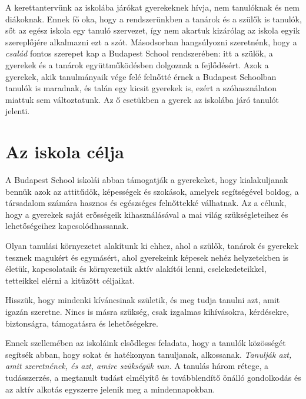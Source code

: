 A kerettantervünk az iskolába járókat gyerekeknek hívja, nem tanulóknak és nem diákoknak. Ennek fő oka, hogy a rendszerünkben a tanárok és a szülők is tanulók, sőt az egész iskola egy tanuló szervezet, így nem akartuk  kizárólag az iskola egyik szereplőjére alkalmazni ezt a szót. Másodsorban hangsúlyozni szeretnénk, hogy a \emph{család} fontos szerepet kap a Budapest School rendszerében: itt a szülők, a gyerekek és a tanárok együttműködésben dolgoznak a fejlődésért. Azok a gyerekek, akik tanulmányaik vége felé felnőtté érnek a Budapest Schoolban tanulók is maradnak, és talán egy kicsit gyerekek is, ezért a szóhasználaton miattuk sem változtatunk. Az ő esetükben a gyerek az iskolába járó tanulót jelenti.  

\section{Az iskola célja}

A Budapest School iskolái abban támogatják a gyerekeket, hogy kialakuljanak bennük azok az attitűdök, képességek és szokások, amelyek segítségével boldog, a társadalom számára hasznos és egészséges felnőttekké válhatnak. Az a célunk, hogy a gyerekek saját erősségeik kihasználásával a mai világ szükségleteihez és lehetőségeihez kapcsolódhassanak.  

Olyan tanulási környezetet alakítunk ki ehhez, ahol a szülők, tanárok és gyerekek tesznek magukért és egymásért, ahol gyerekeink képesek nehéz helyzetekben is életük, kapcsolataik és környezetük aktív alakítói lenni, cselekedeteikkel, tetteikkel elérni a kitűzött céljaikat. 

Hisszük, hogy mindenki kíváncsinak születik, és meg tudja tanulni azt, amit igazán szeretne. Nincs is másra szükség, csak izgalmas kihívásokra, kérdésekre, biztonságra, támogatásra és lehetőségekre.

Ennek szellemében az iskoláink elsődleges feladata, hogy a tanulók közösségét segítsék abban, hogy sokat és hatékonyan tanuljanak, alkossanak. \emph{Tanulják azt, amit szeretnének, és azt, amire szükségük van.} A tanulás három rétege, a tudásszerzés, a megtanult tudást elmélyítő és továbblendítő önálló gondolkodás és az aktív alkotás egyszerre jelenik meg a mindennapokban. 
